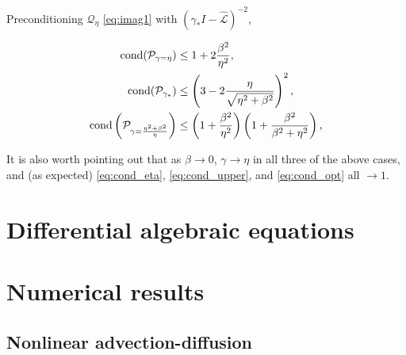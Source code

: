 \documentclass[review]{siamart}
\begin{document}
%
\begin{corollary}\label{cor:independent}
Preconditioning $\mathcal{Q}_\eta$ \eqref{eq:imag1} with
$(\gamma_* I - \widehat{\mathcal{L}})^{-2}$, 

\begin{align}\label{eq:cond_eta}
\textnormal{cond}(\mathcal{P}_{\gamma = \eta}) & \leq 1 + 2\frac{\beta^2}{\eta^2}, \\
\textnormal{cond}(\mathcal{P}_{\gamma_*}) & \leq
	\left(3 - 2\frac{\eta}{\sqrt{\eta^2+\beta^2}}\right)^2, \\
\textnormal{cond}\left(\mathcal{P}_{\gamma = \frac{\eta^2+\beta^2}{\eta}}\right) & \leq
	\left(1 + \frac{\beta^2}{\eta^2}\right) \left(1 + \frac{\beta^2}{\beta^2 + \eta^2}\right), \\
\end{align}

\end{corollary}
%
It is also worth pointing out that as $\beta \to 0$, $\gamma \to \eta$
in all three of the above cases, and (as expected) \eqref{eq:cond_eta},
\eqref{eq:cond_upper}, and \eqref{eq:cond_opt} all $\to 1$.


\section{Differential algebraic equations}\label{sec:dae}



\section{Numerical results}\label{sec:numerics_nonlin}

\subsection{Nonlinear advection-diffusion}\label{sec:numerics_nonlin:advdiff}
\end{document}
